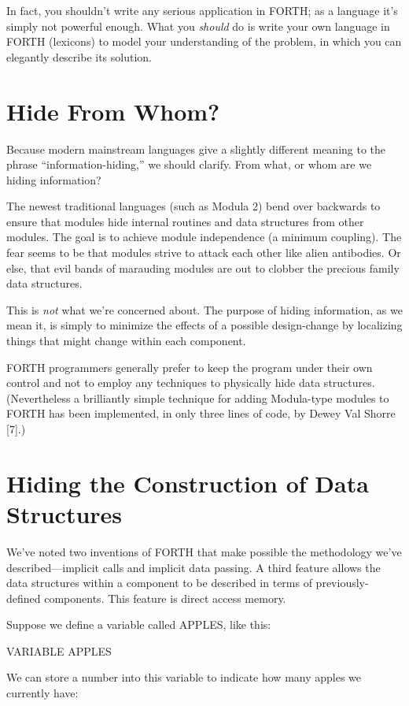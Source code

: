 In fact, you shouldn't write any serious application in FORTH; as
a language it's simply not powerful enough. What you \emph{should}
do is write your own language in FORTH (lexicons) to model your understanding
of the problem, in which you can elegantly describe its solution.


\othersidetrue\section{Hide From Whom?}
\othersidefalse
Because modern mainstream languages give a slightly different meaning
to the phrase {}``information-hiding,'' we should clarify. From
what, or whom are we hiding information?

The newest traditional languages (such as Modula 2) bend over backwards
to ensure that modules hide internal routines and data structures
from other modules. The goal is to achieve module independence (a
minimum coupling). The fear seems to be that modules strive to attack
each other like alien antibodies. Or else, that evil bands of marauding
modules are out to clobber the precious family data structures.

This is \emph{not} what we're concerned about. The purpose of hiding
information, as we mean it, is simply to minimize the effects of a
possible design-change by localizing things that might change within
each component.

FORTH programmers generally prefer to keep the program under their
own control and not to employ any techniques to physically hide data
structures. (Nevertheless a brilliantly simple technique for adding
Modula-type modules to FORTH has been implemented, in only three lines
of code, by Dewey Val Shorre {[}7{]}.)


\section{Hiding the Construction of Data Structures}
We've noted two inventions of FORTH that make possible the methodology
we've described---implicit calls and implicit data passing. A third
feature allows the data structures within a component to be described
in terms of previously-defined components. This feature is direct
access memory.

Suppose we define a variable called APPLES, like this:

\begin{Code}
VARIABLE APPLES
\end{Code}
We can store a number into this variable to indicate how many apples
we currently have:

